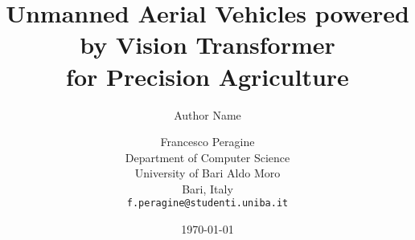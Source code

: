 \documentclass[10pt,twocolumn,letterpaper]{article}
\begin{document}
\title{Unmanned Aerial Vehicles powered by Vision Transformer\\ for Precision Agriculture}
\author{Author Name}
\date{\today}


\author{Francesco Peragine\\
Department of Computer Science\\
University of Bari Aldo Moro\\
Bari, Italy\\
{\tt\small f.peragine@studenti.uniba.it}}

\maketitle
{} 
\pagestyle{plain}

    







{
    \small
    
    
}
\end{document}
